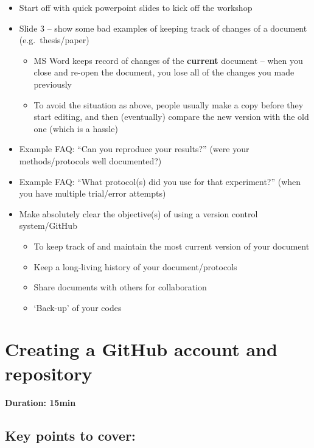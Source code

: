 \documentclass[a4paper, 12pt, oneside]{report} %
\begin{document}
\begin{itemize}
	\item Start off with quick powerpoint slides to kick off the workshop
	\item Slide 3 -- show some bad examples of keeping track of changes of a document (e.g.\ thesis/paper)
		\begin{itemize}
			\item MS Word keeps record of changes of the {\bfseries current} document -- when you close and re-open the document, you lose all of the changes you made previously
			\item To avoid the situation as above, people usually make a copy before they start editing, and then (eventually) compare the new version with the old one (which is a hassle)
		\end{itemize}
	\item Example FAQ: ``Can you reproduce your results?'' (were your methods/protocols well documented?)
	\item Example FAQ: ``What protocol(s) did you use for that experiment?'' (when you have multiple trial/error attempts)
	\item Make absolutely clear the objective(s) of using a version control system/GitHub
		\begin{itemize}
			\item To keep track of and maintain the most current version of your document
			\item Keep a long-living history of your document/protocols
			\item Share documents with others for collaboration
			\item `Back-up' of your codes
		\end{itemize}
\end{itemize}


\section{Creating a GitHub account and repository}
\label{sec:creating_github}

{\bfseries Duration: 15min}

\subsection*{Key points to cover:}
\end{document}
